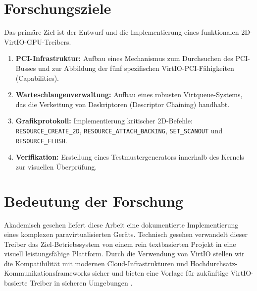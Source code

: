 \section{Forschungsziele}
Das primäre Ziel ist der Entwurf und die Implementierung eines funktionalen 2D-VirtIO-GPU-Treibers.
\begin{enumerate}
    \item \textbf{PCI-Infrastruktur:} Aufbau eines Mechanismus zum Durchsuchen des PCI-Busses und zur Abbildung der fünf spezifischen VirtIO-PCI-Fähigkeiten (Capabilities).
    \item \textbf{Warteschlangenverwaltung:} Aufbau eines robusten Virtqueue-Systems, das die Verkettung von Deskriptoren (Descriptor Chaining) handhabt.
    \item \textbf{Grafikprotokoll:} Implementierung kritischer 2D-Befehle: \texttt{RESOURCE\_CREATE\_2D}, \texttt{RESOURCE\_ATTACH\_BACKING}, \texttt{SET\_SCANOUT} und \texttt{RESOURCE\_FLUSH}.
    \item \textbf{Verifikation:} Erstellung eines Testmustergenerators innerhalb des Kernels zur visuellen Überprüfung.
\end{enumerate}

\section{Bedeutung der Forschung}
Akademisch gesehen liefert diese Arbeit eine dokumentierte Implementierung eines komplexen paravirtualisierten Geräts. Technisch gesehen verwandelt dieser Treiber das Ziel-Betriebssystem von einem rein textbasierten Projekt in eine visuell leistungsfähige Plattform. Durch die Verwendung von VirtIO stellen wir die Kompatibilität mit modernen Cloud-Infrastrukturen und Hochdurchsatz-Kommunikationsframeworks sicher \cite{Zhao2022} und bieten eine Vorlage für zukünftige VirtIO-basierte Treiber in sicheren Umgebungen \cite{DeMatos2025}.

\newpage